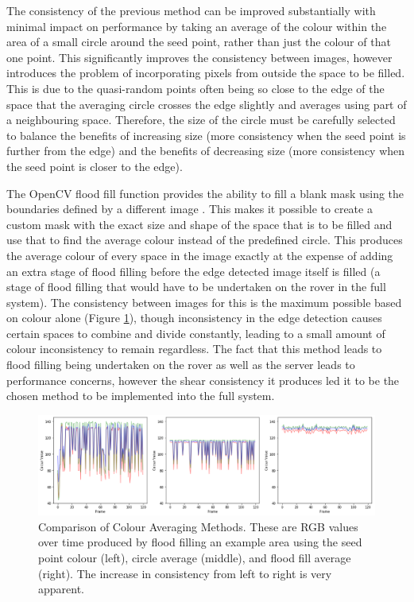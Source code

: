 The consistency of the previous method can be improved substantially with minimal impact on performance by taking an average of the colour within the area of a small circle around the seed point, rather than just the colour of that one point. This significantly improves the consistency between images, however introduces the problem of incorporating pixels from outside the space to be filled. This is due to the quasi-random points often being so close to the edge of the space that the averaging circle crosses the edge slightly and averages using part of a neighbouring space. Therefore, the size of the circle must be carefully selected to balance the benefits of increasing size (more consistency when the seed point is further from the edge) and the benefits of decreasing size (more consistency when the seed point is closer to the edge). 

The OpenCV flood fill function provides the ability to fill a blank mask using the boundaries defined by a different image \cite{bradski2008learning}. This makes it possible to create a custom mask with the exact size and shape of the space that is to be filled and use that to find the average colour instead of the predefined circle. This produces the average colour of every space in the image exactly at the expense of adding an extra stage of flood filling before the edge detected image itself is filled (a stage of flood filling that would have to be undertaken on the rover in the full system). The consistency between images for this is the maximum possible based on colour alone (Figure \ref{fig:ColourConsistency}), though inconsistency in the edge detection causes certain spaces to combine and divide constantly, leading to a small amount of colour inconsistency to remain regardless. The fact that this method leads to flood filling being undertaken on the rover as well as the server leads to performance concerns, however the shear consistency it produces led it to be the chosen method to be implemented into the full system.

\begin{figure}[H]
    \begin{center}
      \includegraphics[width=1\textwidth]{Figures/ColourConsistency.png}
      \caption[Comparison of Colour Averaging Methods]{Comparison of Colour Averaging Methods. These are RGB values over time produced by flood filling an example area using the seed point colour (left), circle average (middle), and flood fill average (right). The increase in consistency from left to right is very apparent.}
      \label{fig:ColourConsistency}
    \end{center}
\end{figure}